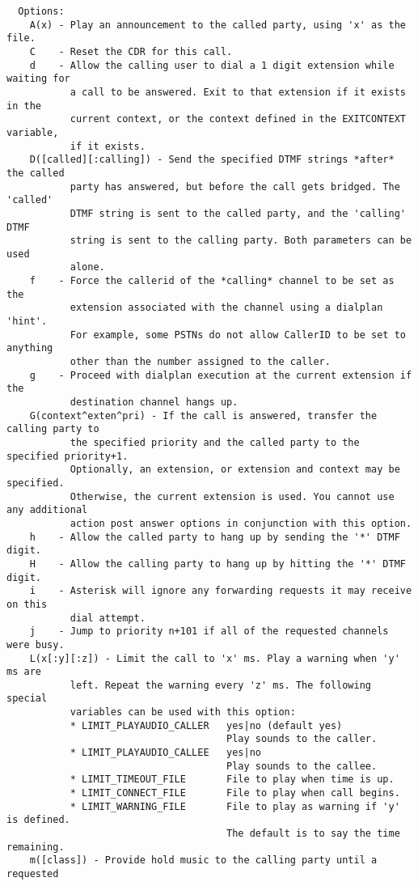 \begin{verbatim}
  Options:
    A(x) - Play an announcement to the called party, using 'x' as the file.
    C    - Reset the CDR for this call.
    d    - Allow the calling user to dial a 1 digit extension while waiting for
           a call to be answered. Exit to that extension if it exists in the
           current context, or the context defined in the EXITCONTEXT variable,
           if it exists.
    D([called][:calling]) - Send the specified DTMF strings *after* the called
           party has answered, but before the call gets bridged. The 'called'
           DTMF string is sent to the called party, and the 'calling' DTMF
           string is sent to the calling party. Both parameters can be used
           alone.
    f    - Force the callerid of the *calling* channel to be set as the
           extension associated with the channel using a dialplan 'hint'.
           For example, some PSTNs do not allow CallerID to be set to anything
           other than the number assigned to the caller.
    g    - Proceed with dialplan execution at the current extension if the
           destination channel hangs up.
    G(context^exten^pri) - If the call is answered, transfer the calling party to
           the specified priority and the called party to the specified priority+1.
           Optionally, an extension, or extension and context may be specified. 
           Otherwise, the current extension is used. You cannot use any additional
           action post answer options in conjunction with this option.
    h    - Allow the called party to hang up by sending the '*' DTMF digit.
    H    - Allow the calling party to hang up by hitting the '*' DTMF digit.
    i    - Asterisk will ignore any forwarding requests it may receive on this
           dial attempt.
    j    - Jump to priority n+101 if all of the requested channels were busy.
    L(x[:y][:z]) - Limit the call to 'x' ms. Play a warning when 'y' ms are
           left. Repeat the warning every 'z' ms. The following special
           variables can be used with this option:
           * LIMIT_PLAYAUDIO_CALLER   yes|no (default yes)
                                      Play sounds to the caller.
           * LIMIT_PLAYAUDIO_CALLEE   yes|no
                                      Play sounds to the callee.
           * LIMIT_TIMEOUT_FILE       File to play when time is up.
           * LIMIT_CONNECT_FILE       File to play when call begins.
           * LIMIT_WARNING_FILE       File to play as warning if 'y' is defined.
                                      The default is to say the time remaining.
    m([class]) - Provide hold music to the calling party until a requested

\end{verbatim}

